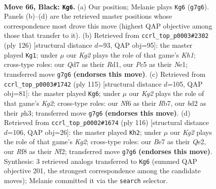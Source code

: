 \documentclass[11pt]{article}
\begin{document}
\clearpage

\begin{figure}[p]\centering
\begin{subfigure}{0.46\textwidth}\centering
\resizebox{\linewidth}{!}{%
\newchessgame
\chessboard[
  setfen={5r2/3qb1k1/5n2/P1p2p1p/3p1Pp1/3Q4/1R1BP2P/3N2K1 b - - 8 66},
  showmover=false,
  pgfstyle=straightmove, color=movearrow, markmove={g7-g6}
]}
\caption{}
\end{subfigure}\hfill
\begin{subfigure}{0.46\textwidth}\centering
\resizebox{\linewidth}{!}{%
\newchessgame
\chessboard[
  setfen={8/1pr2k2/5p1p/3q1bpP/1p1P4/1P3P2/P3Q1P1/3RN2K w - - 5 64},
  showmover=false,
  pgfstyle=straightmove, color=movearrow, markmove={h1-g1}
]}
\caption{}
\end{subfigure}
\\[4pt]
\begin{subfigure}{0.46\textwidth}\centering
\resizebox{\linewidth}{!}{%
\newchessgame
\chessboard[
  setfen={8/1r2q1k1/2b2p2/6p1/2P1p2p/4Q2P/5PP1/3R1BK1 b - - 1 58},
  showmover=false,
  pgfstyle=straightmove, color=movearrow, markmove={g7-g6}
]}
\caption{}
\end{subfigure}\hfill
\begin{subfigure}{0.46\textwidth}\centering
\resizebox{\linewidth}{!}{%
\newchessgame
\chessboard[
  setfen={2b3k1/b3q3/Pn1p2p1/1BpPp1Pp/4P3/5P1N/4QNK1/8 w - - 16 59},
  showmover=false,
  pgfstyle=straightmove, color=movearrow, markmove={g2-h2}
]}
\caption{}
\end{subfigure}
\caption{\textbf{Move 66, Black: \texttt{Kg6}.} (a) Our position; Melanie plays \texttt{Kg6} (\texttt{g7g6}). Panels (b)--(d) are the retrieved master positions whose correspondence most drove this move (highest QAP objective among those that transfer to it). (b) Retrieved from \texttt{ccrl\_top\_p0003\#2302} (ply 126) [structural distance $d$=93, QAP obj=95]: the master played \texttt{Kg1}; under $\mu$ our \emph{Kg2} plays the role of that game's \emph{Kh1}; cross-type roles: our \emph{Q}d7 as their \emph{R}d1, our \emph{P}c5 as their \emph{N}e1; transferred move \texttt{g7g6} \textbf{(endorses this move)}. (c) Retrieved from \texttt{ccrl\_top\_p0003\#1742} (ply 115) [structural distance $d$=105, QAP obj=81]: the master played \texttt{Kg6}; under $\mu$ our \emph{Kg2} plays the role of that game's \emph{Kg2}; cross-type roles: our \emph{N}f6 as their \emph{R}b7, our \emph{b}d2 as their \emph{p}h3; transferred move \texttt{g7g6} \textbf{(endorses this move)}. (d) Retrieved from \texttt{ccrl\_top\_p0002\#1674} (ply 116) [structural distance $d$=106, QAP obj=26]: the master played \texttt{Kh2}; under $\mu$ our \emph{Kg2} plays the role of that game's \emph{Kg2}; cross-type roles: our \emph{B}e7 as their \emph{Q}e2, our \emph{R}f8 as their \emph{N}f2; transferred move \texttt{g7g6} \textbf{(endorses this move)}. Synthesis: 3 retrieved analogs transferred to \texttt{Kg6} (summed QAP objective 201, the strongest correspondence among the candidate moves); Melanie committed it via the \texttt{search} selector.}
\label{fig:thought-m131}
\end{figure}
\end{document}
